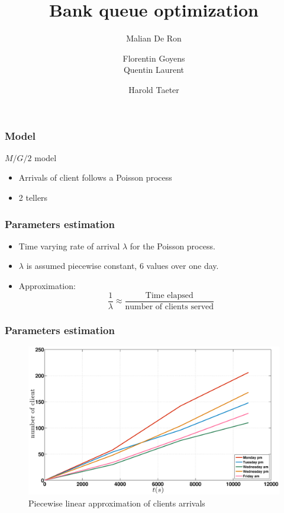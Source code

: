 \documentclass[10pt]{beamer}
\title{Bank queue optimization}
\author[Malian DR, Florentin G, Quentin L, Harlod T]{
  \small
  Malian De Ron
  \and
  Florentin Goyens
  \\
  Quentin Laurent
  \and
  Harold Taeter
}
\begin{document}
\begin{frame}
  \maketitle
\end{frame}

\begin{frame}
  \frametitle{Model}
  \begin{block}{$M/G/2$ model}
  \begin{itemize}
    \item Arrivals of client follows a Poisson process
    \item 2 tellers
    \end{itemize}
  \end{block}
\end{frame}

  \begin{frame}
  \frametitle{Parameters estimation}
 
 \begin{itemize}
 \item Time varying rate of arrival $\lambda$ for the Poisson process. 
 \item $\lambda$ is assumed piecewise constant, 6 values over one day.  
\item Approximation: 
\[\frac{1}{\lambda}\approx \frac{ \text{Time elapsed} }{ \text{number of clients served}}\]  
 \end{itemize}  
  \end{frame}
  
  \begin{frame}
	\frametitle{Parameters estimation}

\begin{figure}
\centering
\includegraphics[width = \textwidth]{../report/images/lambdaApprox.eps}
\caption{Piecewise linear approximation of clients arrivals}
\end{figure}

\end{frame}
\end{document}
